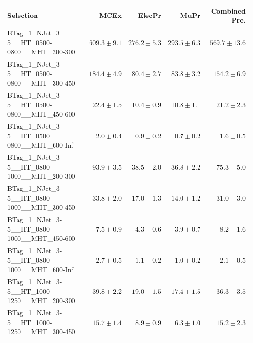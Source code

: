 \documentclass{beamer}
\begin{document}
\begin{frame}
\begin{tabular}{lrrrr}
\bottomrule 
\end{tabular}
\end{frame}

\begin{frame}
\tiny
\begin{tabular}{lrrrr}
\toprule

                                                Selection  &                     MCEx  &           ElecPr  &             MuPr  &          Combined Pre.  \\ 
\midrule
       BTag\_1\_NJet\_3-5\_\_HT\_0500-0800\_\_MHT\_200-300 &             $609.3\pm9.1$&             $276.2\pm5.3$&             $293.5\pm6.3$&                $569.7\pm13.6$ \\ 
      BTag\_1\_NJet\_3-5\_\_HT\_0500-0800\_\_MHT\_300-450 &             $184.4\pm4.9$&              $80.4\pm2.7$&              $83.8\pm3.2$&                 $164.2\pm6.9$ \\ 
      BTag\_1\_NJet\_3-5\_\_HT\_0500-0800\_\_MHT\_450-600 &              $22.4\pm1.5$&              $10.4\pm0.9$&              $10.8\pm1.1$&                  $21.2\pm2.3$ \\ 
      BTag\_1\_NJet\_3-5\_\_HT\_0500-0800\_\_MHT\_600-Inf &               $2.0\pm0.4$&               $0.9\pm0.2$&               $0.7\pm0.2$&                   $1.6\pm0.5$ \\ 
      BTag\_1\_NJet\_3-5\_\_HT\_0800-1000\_\_MHT\_200-300 &              $93.9\pm3.5$&              $38.5\pm2.0$&              $36.8\pm2.2$&                  $75.3\pm5.0$ \\ 
      BTag\_1\_NJet\_3-5\_\_HT\_0800-1000\_\_MHT\_300-450 &              $33.8\pm2.0$&              $17.0\pm1.3$&              $14.0\pm1.2$&                  $31.0\pm3.0$ \\ 
      BTag\_1\_NJet\_3-5\_\_HT\_0800-1000\_\_MHT\_450-600 &               $7.5\pm0.9$&               $4.3\pm0.6$&               $3.9\pm0.7$&                   $8.2\pm1.6$ \\ 
      BTag\_1\_NJet\_3-5\_\_HT\_0800-1000\_\_MHT\_600-Inf &               $2.7\pm0.5$&               $1.1\pm0.2$&               $1.0\pm0.2$&                   $2.1\pm0.5$ \\ 
      BTag\_1\_NJet\_3-5\_\_HT\_1000-1250\_\_MHT\_200-300 &              $39.8\pm2.2$&              $19.0\pm1.5$&              $17.4\pm1.5$&                  $36.3\pm3.5$ \\ 
      BTag\_1\_NJet\_3-5\_\_HT\_1000-1250\_\_MHT\_300-450 &              $15.7\pm1.4$&               $8.9\pm0.9$&               $6.3\pm1.0$&                  $15.2\pm2.3$ \\ 

\end{tabular}
\end{frame}
\end{document}
